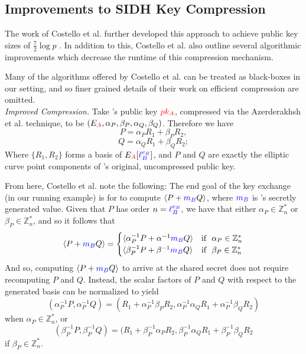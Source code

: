 \subsection{Improvements to SIDH Key Compression}
\label{subsec:costcompression}

The work of Costello et al. further developed this approach to achieve public key sizes of $\frac{7}{2}\log p$ \cite{pkcomp}. In addition to this, Costello et al. also outline several algorithmic improvements which decrease the runtime of this compression mechanism.

Many of the algorithms offered by Costello et al. can be treated as black-boxes in our setting, and so finer grained details of their work on efficient compression are omitted.\\

\noindent
\textit{Improved Compression.} Take \alice's public key $\textcolor{red}{pk_A}$, compressed via the Azerderakhsh et al. technique, to be $(E_{\textcolor{red}{A}}, \alpha_{P}, \beta_{P}, \alpha_{Q}, \beta_{Q})$. Therefore we have
$$
P = \alpha_{P}R_1 + \beta_{P}R_2,
$$
$$
Q = \alpha_{Q}R_1 + \beta_{Q}R_2;
$$
Where $\{R_1, R_2\}$ forms a basis of $E_{\textcolor{red}{A}}[\textcolor{blue}{\ell_{B}^{e_B}}]$, and $P$ and $Q$ are exactly the elliptic curve point components of \alice's original, uncompressed public key.

From here, Costello et al. note the following: The end goal of the key exchange (in our running example) is for \bob to compute $\langle P + \textcolor{blue}{m_B} Q\rangle$, where $\textcolor{blue}{m_B}$ is \bob's secretly generated value. Given that $P$ has order $n = \textcolor{blue}{\ell_{B}^{e_B}}$, we have that either $\alpha_{P} \in \mathbb{Z}^{*}_{n}$ or $\beta_{P} \in \mathbb{Z}^{*}_{n}$, and so it follows that
$$
\langle P + \textcolor{blue}{m_B} Q \rangle =  \begin{cases}
							\langle \alpha^{-1}_{P}P + \alpha^{-1}\textcolor{blue}{m_B} Q \rangle & \text{if }\ \alpha_{P} \in \mathbb{Z}^{*}_{n}\\
							\langle \beta^{-1}_{P}P + \beta^{-1}\textcolor{blue}{m_B} Q \rangle & \text{if }\ \beta_{P} \in \mathbb{Z}^{*}_{n}
							\end{cases}
$$
And so, computing $\langle P + \textcolor{blue}{m_B} Q\rangle$ to arrive at the shared secret does not require recomputing $P$ and $Q$. Instead, the scalar factors of $P$ and $Q$ with respect to the generated basis can be normalized to yield
$$
(\alpha^{-1}_{P}P, \alpha^{-1}_{P}Q) = (R_{1} + \alpha^{-1}_{P}\beta_{P} R_{2}, \alpha^{-1}_{P}\alpha_{Q}R_{1} + \alpha^{-1}_{P}\beta_{Q}R_{2})
$$
when $\alpha_{P} \in \mathbb{Z}^{*}_{n}$, or
$$
(\beta^{-1}_{P}P, \beta^{-1}_{P}Q) = (R_{1} + \beta^{-1}_{P}\alpha_{P} R_{2}, \beta^{-1}_{P}\alpha_{Q}R_{1} + \beta^{-1}_{P}\beta_{Q}R_{2}
$$
if $\beta_{P} \in \mathbb{Z}^{*}_{n}$.\\

